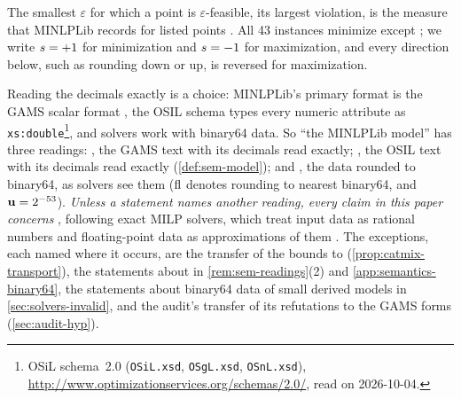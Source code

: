 The smallest $\varepsilon$ for which a point is $\varepsilon$-feasible, its largest violation, is the measure that MINLPLib records for listed points \citep{vigerske2026-minlplib-documentation-database-snapshot-2026}.
All 43 instances minimize except ; we write $s=+1$ for minimization and $s=-1$ for maximization, and every direction below, such as rounding down or up, is reversed for maximization.

Reading the decimals exactly is a choice: MINLPLib's primary format is the GAMS scalar format \citep{vigerske2026-minlplib-a-library-of-mixed}, the OSIL schema types every numeric attribute as \texttt{xs:double}\footnote{OSiL schema~2.0 (\texttt{OSiL.xsd}, \texttt{OSgL.xsd}, \texttt{OSnL.xsd}), \url{http://www.optimizationservices.org/schemas/2.0/}, read on 2026-10-04.}, and solvers work with binary64 data.
So ``the MINLPLib model'' has three readings:
, the GAMS text with its decimals read exactly;
, the OSIL text with its decimals read exactly (\cref{def:sem-model});
and , the data rounded to binary64, as solvers see them ($\operatorname{fl}$ denotes rounding to nearest binary64, and $\mathbf{u}=2^{-53}$).
\emph{Unless a statement names another reading, every claim in this paper concerns }, following exact MILP solvers, which treat input data as rational numbers and floating-point data as approximations of them \citep{cook2011-an-exact-rational-mixed-integer,eifler2023-a-computational-status-update-for,hoen2025-analyzing-the-numerical-correctness-of}.
The exceptions, each named where it occurs, are the transfer of the  bounds to  (\cref{prop:catmix-transport}), the statements about  in \cref{rem:sem-readings}(2) and \cref{app:semantics-binary64}, the statements about binary64 data of small derived models in \cref{sec:solvers-invalid}, and the audit's transfer of its refutations to the GAMS forms (\cref{sec:audit-hyp}).

